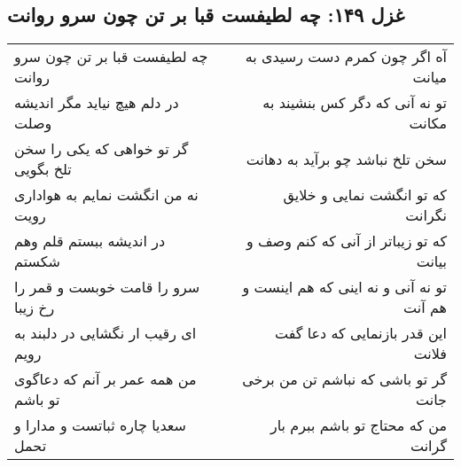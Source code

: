 \begin{center}
\section*{غزل ۱۴۹: چه لطیفست قبا بر تن چون سرو روانت}
\label{sec:149}
\begin{longtable}{l p{0.5cm} r}
چه لطیفست قبا بر تن چون سرو روانت
&&
آه اگر چون کمرم دست رسیدی به میانت
\\
در دلم هیچ نیاید مگر اندیشه وصلت
&&
تو نه آنی که دگر کس بنشیند به مکانت
\\
گر تو خواهی که یکی را سخن تلخ بگویی
&&
سخن تلخ نباشد چو برآید به دهانت
\\
نه من انگشت نمایم به هواداری رویت
&&
که تو انگشت نمایی و خلایق نگرانت
\\
در اندیشه ببستم قلم وهم شکستم
&&
که تو زیباتر از آنی که کنم وصف و بیانت
\\
سرو را قامت خوبست و قمر را رخ زیبا
&&
تو نه آنی و نه اینی که هم اینست و هم آنت
\\
ای رقیب ار نگشایی در دلبند به رویم
&&
این قدر بازنمایی که دعا گفت فلانت
\\
من همه عمر بر آنم که دعاگوی تو باشم
&&
گر تو باشی که نباشم تن من برخی جانت
\\
سعدیا چاره ثباتست و مدارا و تحمل
&&
من که محتاج تو باشم ببرم بار گرانت
\\
\end{longtable}
\end{center}
